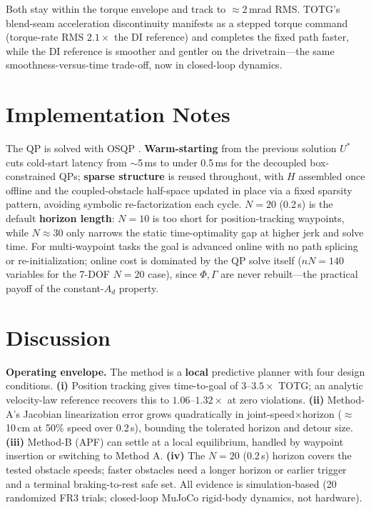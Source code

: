 Both stay within the torque envelope and track to \(\approx\)2\,mrad RMS.
TOTG's blend-seam acceleration discontinuity manifests as a stepped torque
command (torque-rate RMS \(2.1\times\) the DI reference) and completes the
fixed path faster, while the DI reference is smoother and gentler on the
drivetrain---the same smoothness-versus-time trade-off, now in closed-loop
dynamics.

\section{Implementation Notes}\label{vii.-implementation-notes}

The QP is solved with OSQP \cite{osqp}. \textbf{Warm-starting} from the
previous solution \(U^*\) cuts cold-start latency from $\sim$5\,ms to under
0.5\,ms for the decoupled box-constrained QPs; \textbf{sparse structure} is
reused throughout, with \(H\) assembled once offline and the
coupled-obstacle half-space updated in place via a fixed sparsity pattern,
avoiding symbolic re-factorization each cycle. \(N=20\) (0.2\,s) is the
default \textbf{horizon length}: \(N=10\) is too short for position-tracking
waypoints, while \(N\approx30\) only narrows the static time-optimality gap
at higher jerk and solve time. For multi-waypoint tasks the goal is advanced
online with no path splicing or re-initialization; online cost is dominated
by the QP solve itself (\(nN=140\) variables for the 7-DOF \(N{=}20\) case),
since \(\Phi,\Gamma\) are never rebuilt---the practical payoff of the
constant-\(A_d\) property.

\section{Discussion}\label{viii.-discussion}

\textbf{Operating envelope.}\label{scope-and-limitations}
The method is a \textbf{local} predictive planner with four design
conditions. \textbf{(i)} Position tracking gives time-to-goal of
\(3\)--\(3.5\times\) TOTG; an analytic velocity-law reference recovers this
to \(1.06\)--\(1.32\times\) at zero violations. \textbf{(ii)} Method-A's
Jacobian linearization error grows quadratically in
joint-speed\(\times\)horizon (\(\approx\)10\,cm at 50\% speed over 0.2\,s),
bounding the tolerated horizon and detour size. \textbf{(iii)} Method-B
(APF) can settle at a local equilibrium, handled by waypoint insertion or
switching to Method A. \textbf{(iv)} The \(N=20\) (0.2\,s) horizon covers
the tested obstacle speeds; faster obstacles need a longer horizon or
earlier trigger and a terminal braking-to-rest safe set. All evidence
is simulation-based (20 randomized FR3 trials; closed-loop MuJoCo
rigid-body dynamics, not hardware).

